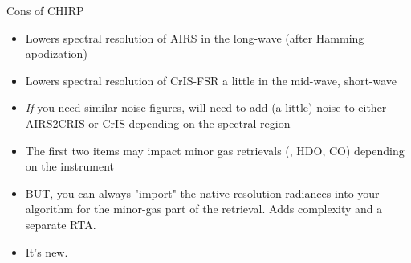 \documentclass[10pt,t]{beamer}
\begin{document}
\begin{frame}[label={sec:org756e3be}]{Cons of CHIRP}
\begin{itemize}
\item Lowers spectral resolution of AIRS in the long-wave (after Hamming apodization)
\item Lowers spectral resolution of CrIS-FSR a little in the mid-wave, short-wave
\item \emph{If} you need similar noise figures, will need to add (a little) noise to either AIRS2CRIS or CrIS depending on the spectral region
\item The first two items may impact minor gas retrievals (\methane, HDO, CO) depending on the instrument
\item BUT, you can always "import" the native resolution radiances into your algorithm for the minor-gas part of the retrieval.  Adds complexity and a separate RTA.
\item It's new.
\end{itemize}
\end{frame}
\end{document}
